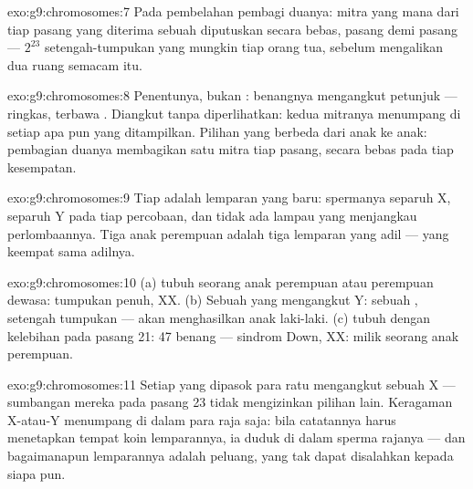 \begin{solution}{exo:g9:chromosomes:7}
Pada pembelahan pembagi duanya: mitra yang mana dari tiap
pasang yang diterima sebuah  diputuskan secara bebas,
pasang demi pasang --- $2^{23}$ setengah-tumpukan yang
mungkin tiap orang tua, sebelum  mengalikan dua
ruang semacam itu.
\end{solution}

\begin{solution}{exo:g9:chromosomes:8}
Penentunya, bukan : benangnya mengangkut petunjuk
--- ringkas, terbawa . Diangkut tanpa diperlihatkan:
kedua mitranya menumpang di setiap  apa pun yang
ditampilkan. Pilihan yang berbeda dari anak ke anak:
pembagian duanya membagikan satu mitra tiap pasang, secara
bebas pada tiap kesempatan.
\end{solution}

\begin{solution}{exo:g9:chromosomes:9}
Tiap  adalah lemparan yang baru:  spermanya
separuh X, separuh Y pada tiap percobaan, dan tidak ada
 lampau yang menjangkau perlombaannya. Tiga anak
perempuan adalah tiga lemparan yang adil --- yang keempat
sama adilnya.
\end{solution}

\begin{solution}{exo:g9:chromosomes:10}
(a)  tubuh seorang anak perempuan atau perempuan dewasa:
tumpukan penuh, XX. (b) Sebuah  yang mengangkut Y:
sebuah , setengah tumpukan ---  akan
menghasilkan anak laki-laki. (c)  tubuh dengan kelebihan
pada pasang 21: 47 benang ---  sindrom Down, XX:
milik seorang anak perempuan.
\end{solution}

\begin{solution}{exo:g9:chromosomes:11}
Setiap  yang dipasok para ratu mengangkut sebuah X ---
sumbangan mereka pada pasang 23 tidak mengizinkan pilihan
lain. Keragaman X-atau-Y menumpang di dalam  para raja
saja: bila catatannya harus menetapkan tempat koin
lemparannya, ia duduk di dalam sperma rajanya --- dan
bagaimanapun lemparannya adalah peluang, yang tak dapat
disalahkan kepada siapa pun.
\end{solution}


